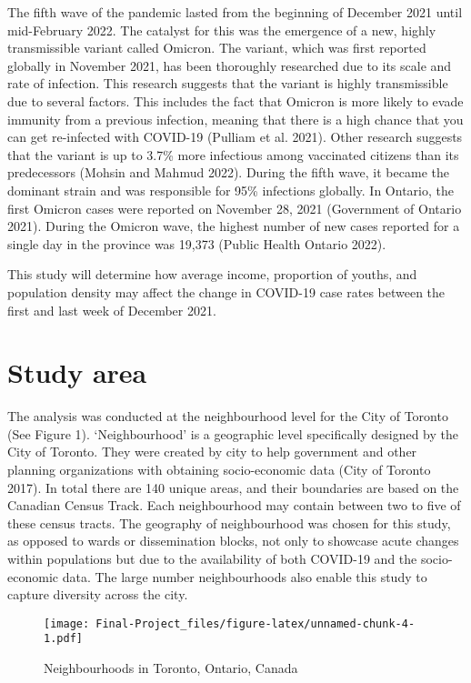 \documentclass[]{article}
\begin{document}
The fifth wave of the pandemic lasted from the beginning of December
2021 until mid-February 2022. The catalyst for this was the emergence of
a new, highly transmissible variant called Omicron. The variant, which
was first reported globally in November 2021, has been thoroughly
researched due to its scale and rate of infection. This research
suggests that the variant is highly transmissible due to several
factors. This includes the fact that Omicron is more likely to evade
immunity from a previous infection, meaning that there is a high chance
that you can get re-infected with COVID-19 (Pulliam et al. 2021). Other
research suggests that the variant is up to 3.7\% more infectious among
vaccinated citizens than its predecessors (Mohsin and Mahmud 2022).
During the fifth wave, it became the dominant strain and was responsible
for 95\% infections globally. In Ontario, the first Omicron cases were
reported on November 28, 2021 (Government of Ontario 2021). During the
Omicron wave, the highest number of new cases reported for a single day
in the province was 19,373 (Public Health Ontario 2022).

This study will determine how average income, proportion of youths, and
population density may affect the change in COVID-19 case rates between
the first and last week of December 2021.

\hypertarget{study-area}{%
\section{Study area}\label{study-area}}

The analysis was conducted at the neighbourhood level for the City of
Toronto (See Figure 1). `Neighbourhood' is a geographic level
specifically designed by the City of Toronto. They were created by city
to help government and other planning organizations with obtaining
socio-economic data (City of Toronto 2017). In total there are 140
unique areas, and their boundaries are based on the Canadian Census
Track. Each neighbourhood may contain between two to five of these
census tracts. The geography of neighbourhood was chosen for this study,
as opposed to wards or dissemination blocks, not only to showcase acute
changes within populations but due to the availability of both COVID-19
and the socio-economic data. The large number neighbourhoods also enable
this study to capture diversity across the city.

\begin{figure}
\centering
\texttt{[image: Final-Project\_files/figure-latex/unnamed-chunk-4-1.pdf]}
\caption{Neighbourhoods in Toronto, Ontario, Canada}
\end{figure}
\end{document}
